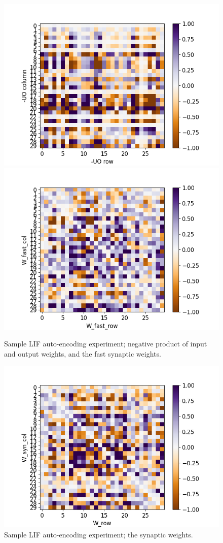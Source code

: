 \documentclass[mphil,deptreport,ianc]{infthesis} %
\begin{document}
\begin{figure}[!h]
    \centering
    \includegraphics[width=0.49\columnwidth]{figures/Supplementary/gating/LIF/AutoEncoding/01-04_16-35-37-680/test_heatmap_compare_minUO.png}
    \includegraphics[width=0.49\columnwidth]{figures/Supplementary/gating/LIF/AutoEncoding/01-04_16-35-37-680/test_heatmap_compare_W_fast.png}
    \caption{Sample LIF auto-encoding experiment; negative product of input and output weights, and the fast synaptic weights.}
    \label{fig:LIF_AE_1_neg_UO_W_fast}
\end{figure}

\begin{figure}[!h]
    \centering
    \includegraphics[width=0.6\columnwidth]{figures/Supplementary/gating/LIF/AutoEncoding/01-04_16-35-37-680/test_heatmap_W.png}
    \caption{Sample LIF auto-encoding experiment; the synaptic weights.}
    \label{fig:LIF_AE_1_W_syn}
\end{figure}
\end{document}
